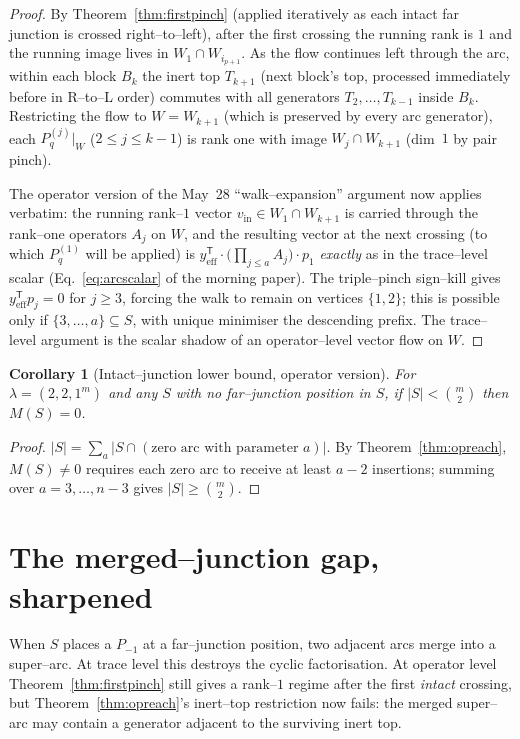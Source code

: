 \documentclass[11pt]{article}
\newtheorem{corollary}[theorem]{Corollary}
\theoremstyle{definition}
\newcommand{\Pq}{P_{q}}
\newcommand{\Pm}{P_{-1}}
\newcommand{\la}{\lambda}
\newcommand{\W}{W}
\begin{document}
\begin{proof}
By Theorem~\ref{thm:firstpinch} (applied iteratively as each intact far
junction is crossed right--to--left), after the first crossing the running
rank is $1$ and the running image lives in $\W_1\cap\W_{i_{p+1}}$. As the flow
continues left through the arc, within each block $B_k$ the inert top
$T_{k+1}$ (next block's top, processed immediately before in R--to--L order)
commutes with all generators $T_2,\dots,T_{k-1}$ inside $B_k$. Restricting the
flow to $\W=\W_{k+1}$ (which is preserved by every arc generator), each
$\Pq^{(j)}|_\W$ ($2\le j\le k-1$) is rank one with image
$\W_j\cap\W_{k+1}$ (dim~$1$ by pair pinch).

The operator version of the May~28 ``walk--expansion'' argument now applies
verbatim: the running rank--$1$ vector $v_\text{in}\in\W_1\cap\W_{k+1}$ is
carried through the rank--one operators $A_j$ on $\W$, and the resulting
vector at the next crossing (to which $\Pq^{(1)}$ will be applied) is
$y^{\mathsf T}_\text{eff}\cdot\bigl(\prod_{j\le a}A_j\bigr)\cdot p_1$
\emph{exactly} as in the trace--level scalar (Eq.~\eqref{eq:arcscalar} of the
morning paper). The triple--pinch sign--kill gives
$y^{\mathsf T}_\text{eff}p_j=0$ for $j\ge3$, forcing the walk to remain on
vertices $\{1,2\}$; this is possible only if $\{3,\dots,a\}\subseteq S$, with
unique minimiser the descending prefix. The trace--level argument is the
scalar shadow of an operator--level vector flow on $\W$.
\end{proof}

\begin{corollary}[Intact--junction lower bound, operator version]\label{cor:intactlb}
For $\la=(2,2,1^m)$ and any $S$ with no far--junction position in $S$, if
$|S|<\binom m2$ then $M(S)=0$.
\end{corollary}

\begin{proof}
$|S|=\sum_a|S\cap(\text{zero arc with parameter }a)|$. By
Theorem~\ref{thm:opreach}, $M(S)\ne0$ requires each zero arc to receive at
least $a-2$ insertions; summing over $a=3,\dots,n-3$ gives $|S|\ge\binom m2$.
\end{proof}

\section{The merged--junction gap, sharpened}

When $S$ places a $\Pm$ at a far--junction position, two adjacent arcs merge
into a super--arc. At trace level this destroys the cyclic factorisation. At
operator level Theorem~\ref{thm:firstpinch} still gives a rank--$1$ regime
after the first \emph{intact} crossing, but Theorem~\ref{thm:opreach}'s
inert--top restriction now fails: the merged super--arc may contain a
generator adjacent to the surviving inert top.
\end{document}

